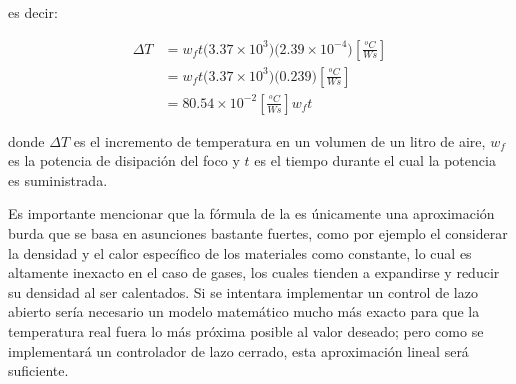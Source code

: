 \noindent es decir:

\begin{align}
	\Delta T
	&= w_{f}t\big(3.37\times10^3\big) \big(2.39\times10^{-4}\big)\left[\tfrac{^{o}C}{Ws}\right]\\
	&= w_{f}t\big(3.37\times10^3\big) \big(0.239\big)\left[\tfrac{^{o}C}{Ws}\right]\\
\label{eqn:pow-temp}
	&= 80.54\times10^{-2}\left[\tfrac{^{o}C}{Ws}\right]w_{f}t
\end{align}

\noindent donde $\Delta T$ es el incremento de temperatura en un volumen de un litro de aire, $w_f$ es la potencia de disipación del foco y $t$ es el tiempo durante el cual la potencia es suministrada.

Es importante mencionar que la fórmula de la  es únicamente una aproximación burda que se basa en asunciones bastante fuertes, como por ejemplo el considerar la densidad y el calor específico de los materiales como constante, lo cual es altamente inexacto en el caso de gases, los cuales tienden a expandirse y reducir su densidad al ser calentados.
Si se intentara implementar un control de lazo abierto sería necesario un modelo matemático mucho más exacto\footnotemark{} para que la temperatura real fuera lo más próxima posible al valor deseado; pero como se implementará un controlador de lazo cerrado, esta aproximación lineal será suficiente.
